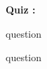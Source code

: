\documentclass{article}
\begin{document}
\begin{center}
{\Large \textbf{Quiz \quiz: \topic}}
\end{center}

\begin{enumerate}
{
\ifcsname question \endcsname
\item \csname question \endcsname
\else
\setcounter{x}{-1}
\fi
}
\end{enumerate}
\end{document}
